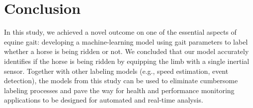 \section{Conclusion}
\label{sec:conclusion}

In this study, we achieved a novel outcome on one of the essential aspects of equine gait: developing a machine-learning model using gait parameters to label whether a horse is being ridden or not. We concluded that our model accurately identifies if the horse is being ridden by equipping the limb with a single inertial sensor. Together with other labeling models (e.g., speed estimation, event detection), the models from this study can be used to eliminate cumbersome labeling processes and pave the way for health and performance monitoring applications to be designed for automated and real-time analysis. 